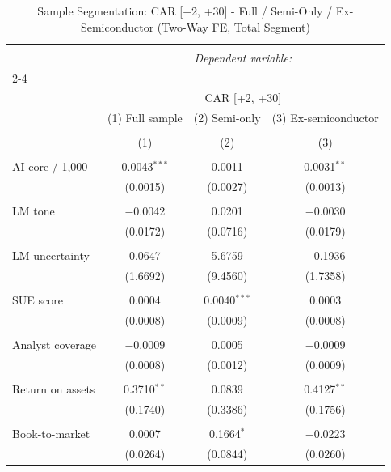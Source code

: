 
\begin{table}[!htbp] \centering 
  \caption{Sample Segmentation: CAR [+2, +30] - Full / Semi-Only / Ex-Semiconductor (Two-Way FE, Total Segment)} 
  \label{} 
\begin{tabular}{@{\extracolsep{5pt}}lccc} 
\\[-1.8ex]\hline 
\hline \\[-1.8ex] 
 & \multicolumn{3}{c}{\textit{Dependent variable:}} \\ 
\cline{2-4} 
\\[-1.8ex] & \multicolumn{3}{c}{CAR [+2, +30]} \\ 
 & (1) Full sample & (2) Semi-only & (3) Ex-semiconductor \\ 
\\[-1.8ex] & (1) & (2) & (3)\\ 
\hline \\[-1.8ex] 
 AI-core / 1,000 & 0.0043$^{***}$ & 0.0011 & 0.0031$^{**}$ \\ 
  & (0.0015) & (0.0027) & (0.0013) \\ 
  & & & \\ 
 LM tone & $-$0.0042 & 0.0201 & $-$0.0030 \\ 
  & (0.0172) & (0.0716) & (0.0179) \\ 
  & & & \\ 
 LM uncertainty & 0.0647 & 5.6759 & $-$0.1936 \\ 
  & (1.6692) & (9.4560) & (1.7358) \\ 
  & & & \\ 
 SUE score & 0.0004 & 0.0040$^{***}$ & 0.0003 \\ 
  & (0.0008) & (0.0009) & (0.0008) \\ 
  & & & \\ 
 Analyst coverage & $-$0.0009 & 0.0005 & $-$0.0009 \\ 
  & (0.0008) & (0.0012) & (0.0009) \\ 
  & & & \\ 
 Return on assets & 0.3710$^{**}$ & 0.0839 & 0.4127$^{**}$ \\ 
  & (0.1740) & (0.3386) & (0.1756) \\ 
  & & & \\ 
 Book-to-market & 0.0007 & 0.1664$^{*}$ & $-$0.0223 \\ 
  & (0.0264) & (0.0844) & (0.0260) \\ 

\end{tabular}
\end{table}

